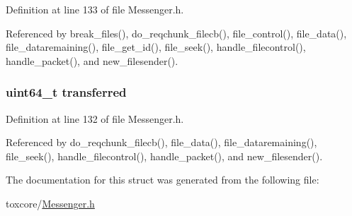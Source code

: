 Definition at line 133 of file Messenger.\+h.



Referenced by break\+\_\+files(), do\+\_\+reqchunk\+\_\+filecb(), file\+\_\+control(), file\+\_\+data(), file\+\_\+dataremaining(), file\+\_\+get\+\_\+id(), file\+\_\+seek(), handle\+\_\+filecontrol(), handle\+\_\+packet(), and new\+\_\+filesender().

\hypertarget{struct_file___transfers_ae0a9ddd27f7c6669cb964f6245b2550d}{
\subsubsection[{transferred}]{\setlength{\rightskip}{0pt plus 5cm}uint64\+\_\+t transferred}}\label{struct_file___transfers_ae0a9ddd27f7c6669cb964f6245b2550d}


Definition at line 132 of file Messenger.\+h.



Referenced by do\+\_\+reqchunk\+\_\+filecb(), file\+\_\+data(), file\+\_\+dataremaining(), file\+\_\+seek(), handle\+\_\+filecontrol(), handle\+\_\+packet(), and new\+\_\+filesender().



The documentation for this struct was generated from the following file\+:\begin{DoxyCompactItemize}
\item 
toxcore/\hyperlink{_messenger_8h}{Messenger.\+h}\end{DoxyCompactItemize}
